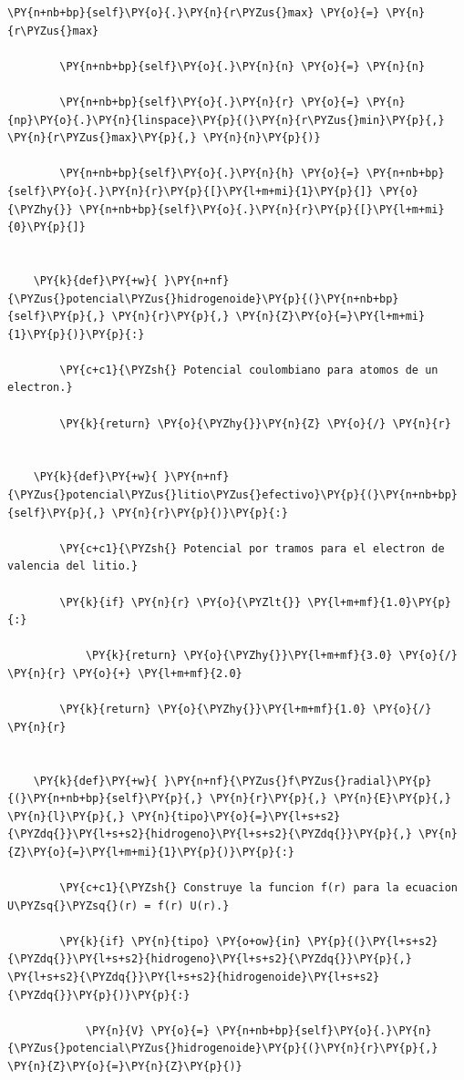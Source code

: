 \documentclass[11pt]{article}
\makeatletter
\def\PY@reset{\let\PY@it=\relax \let\PY@bf=\relax \let\PY@ul=\relax \let\PY@tc=\relax \let\PY@bc=\relax \let\PY@ff=\relax}
\def\PY@tok#1{\csname PY@tok@#1\endcsname}
\def\PY@toks#1+{\ifx\relax#1\empty\else \PY@tok{#1}\expandafter\PY@toks\fi}
\def\PY@do#1{\PY@bc{\PY@tc{\PY@ul{\PY@it{\PY@bf{\PY@ff{#1}}}}}}}
\def\PY#1#2{\PY@reset\PY@toks#1+\relax+\PY@do{#2}}
\makeatother
\begin{document}
\begin{tcolorbox}[breakable, size=fbox, boxrule=1pt, pad at break*=1mm,colback=cellbackground, colframe=cellborder]
\begin{Verbatim}[commandchars=\\\{\}]
        \PY{n+nb+bp}{self}\PY{o}{.}\PY{n}{r\PYZus{}max} \PY{o}{=} \PY{n}{r\PYZus{}max}

        \PY{n+nb+bp}{self}\PY{o}{.}\PY{n}{n} \PY{o}{=} \PY{n}{n}

        \PY{n+nb+bp}{self}\PY{o}{.}\PY{n}{r} \PY{o}{=} \PY{n}{np}\PY{o}{.}\PY{n}{linspace}\PY{p}{(}\PY{n}{r\PYZus{}min}\PY{p}{,} \PY{n}{r\PYZus{}max}\PY{p}{,} \PY{n}{n}\PY{p}{)}

        \PY{n+nb+bp}{self}\PY{o}{.}\PY{n}{h} \PY{o}{=} \PY{n+nb+bp}{self}\PY{o}{.}\PY{n}{r}\PY{p}{[}\PY{l+m+mi}{1}\PY{p}{]} \PY{o}{\PYZhy{}} \PY{n+nb+bp}{self}\PY{o}{.}\PY{n}{r}\PY{p}{[}\PY{l+m+mi}{0}\PY{p}{]}


    \PY{k}{def}\PY{+w}{ }\PY{n+nf}{\PYZus{}potencial\PYZus{}hidrogenoide}\PY{p}{(}\PY{n+nb+bp}{self}\PY{p}{,} \PY{n}{r}\PY{p}{,} \PY{n}{Z}\PY{o}{=}\PY{l+m+mi}{1}\PY{p}{)}\PY{p}{:}

        \PY{c+c1}{\PYZsh{} Potencial coulombiano para atomos de un electron.}

        \PY{k}{return} \PY{o}{\PYZhy{}}\PY{n}{Z} \PY{o}{/} \PY{n}{r}


    \PY{k}{def}\PY{+w}{ }\PY{n+nf}{\PYZus{}potencial\PYZus{}litio\PYZus{}efectivo}\PY{p}{(}\PY{n+nb+bp}{self}\PY{p}{,} \PY{n}{r}\PY{p}{)}\PY{p}{:}

        \PY{c+c1}{\PYZsh{} Potencial por tramos para el electron de valencia del litio.}

        \PY{k}{if} \PY{n}{r} \PY{o}{\PYZlt{}} \PY{l+m+mf}{1.0}\PY{p}{:}

            \PY{k}{return} \PY{o}{\PYZhy{}}\PY{l+m+mf}{3.0} \PY{o}{/} \PY{n}{r} \PY{o}{+} \PY{l+m+mf}{2.0}

        \PY{k}{return} \PY{o}{\PYZhy{}}\PY{l+m+mf}{1.0} \PY{o}{/} \PY{n}{r}


    \PY{k}{def}\PY{+w}{ }\PY{n+nf}{\PYZus{}f\PYZus{}radial}\PY{p}{(}\PY{n+nb+bp}{self}\PY{p}{,} \PY{n}{r}\PY{p}{,} \PY{n}{E}\PY{p}{,} \PY{n}{l}\PY{p}{,} \PY{n}{tipo}\PY{o}{=}\PY{l+s+s2}{\PYZdq{}}\PY{l+s+s2}{hidrogeno}\PY{l+s+s2}{\PYZdq{}}\PY{p}{,} \PY{n}{Z}\PY{o}{=}\PY{l+m+mi}{1}\PY{p}{)}\PY{p}{:}

        \PY{c+c1}{\PYZsh{} Construye la funcion f(r) para la ecuacion U\PYZsq{}\PYZsq{}(r) = f(r) U(r).}

        \PY{k}{if} \PY{n}{tipo} \PY{o+ow}{in} \PY{p}{(}\PY{l+s+s2}{\PYZdq{}}\PY{l+s+s2}{hidrogeno}\PY{l+s+s2}{\PYZdq{}}\PY{p}{,} \PY{l+s+s2}{\PYZdq{}}\PY{l+s+s2}{hidrogenoide}\PY{l+s+s2}{\PYZdq{}}\PY{p}{)}\PY{p}{:}

            \PY{n}{V} \PY{o}{=} \PY{n+nb+bp}{self}\PY{o}{.}\PY{n}{\PYZus{}potencial\PYZus{}hidrogenoide}\PY{p}{(}\PY{n}{r}\PY{p}{,} \PY{n}{Z}\PY{o}{=}\PY{n}{Z}\PY{p}{)}


\end{Verbatim}
\end{tcolorbox}
\end{document}
